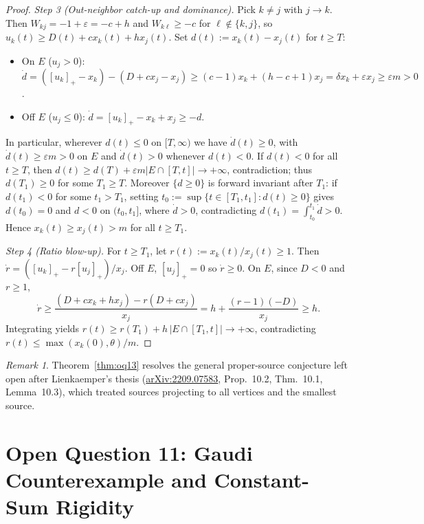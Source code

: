 \documentclass[11pt]{article}
\theoremstyle{plain}
\theoremstyle{definition}
\theoremstyle{remark}
\newtheorem{remark}{Remark}
\begin{document}
\begin{proof}
\emph{Step 3 (Out-neighbor catch-up and dominance).} Pick $k \neq j$ with $j \to k$. Then $W_{kj} = -1 + \varepsilon = -c + h$ and $W_{k\ell} \ge -c$ for $\ell \notin \{k, j\}$, so $u_k(t) \ge D(t) + c x_k(t) + h x_j(t)$. Set $d(t) := x_k(t) - x_j(t)$ for $t \ge T$:
\begin{itemize}[leftmargin=2em,itemsep=1pt]
\item On $E$ ($u_j > 0$): $\dot{d} = ([u_k]_+ - x_k) - (D + c x_j - x_j) \ge (c-1)x_k + (h - c + 1)x_j = \delta x_k + \varepsilon x_j \ge \varepsilon m > 0$.
\item Off $E$ ($u_j \le 0$): $\dot{d} = [u_k]_+ - x_k + x_j \ge -d$.
\end{itemize}
In particular, wherever $d(t) \le 0$ on $[T, \infty)$ we have $\dot{d}(t) \ge 0$, with $\dot{d}(t) \ge \varepsilon m > 0$ on $E$ and $\dot{d}(t) > 0$ whenever $d(t) < 0$. If $d(t) < 0$ for all $t \ge T$, then $d(t) \ge d(T) + \varepsilon m |E \cap [T, t]| \to +\infty$, contradiction; thus $d(T_1) \ge 0$ for some $T_1 \ge T$. Moreover $\{d \ge 0\}$ is forward invariant after $T_1$: if $d(t_1) < 0$ for some $t_1 > T_1$, setting $t_0 := \sup\{t \in [T_1, t_1] : d(t) \ge 0\}$ gives $d(t_0) = 0$ and $d < 0$ on $(t_0, t_1]$, where $\dot{d} > 0$, contradicting $d(t_1) = \int_{t_0}^{t_1} \dot{d} > 0$. Hence $x_k(t) \ge x_j(t) > m$ for all $t \ge T_1$.

\emph{Step 4 (Ratio blow-up).} For $t \ge T_1$, let $r(t) := x_k(t) / x_j(t) \ge 1$. Then $\dot{r} = ([u_k]_+ - r[u_j]_+)/x_j$. Off $E$, $[u_j]_+ = 0$ so $\dot{r} \ge 0$. On $E$, since $D < 0$ and $r \ge 1$,
\[
\dot{r} \ge \frac{(D + c x_k + h x_j) - r(D + c x_j)}{x_j} = h + \frac{(r - 1)(-D)}{x_j} \ge h.
\]
Integrating yields $r(t) \ge r(T_1) + h\,|E \cap [T_1, t]| \to +\infty$, contradicting $r(t) \le \max(x_k(0), \theta)/m$.
\end{proof}

\begin{remark}
Theorem~\ref{thm:oq13} resolves the general proper-source conjecture left open after Lienkaemper's thesis (\href{https://arxiv.org/abs/2209.07583}{arXiv:2209.07583}, Prop.~10.2, Thm.~10.1, Lemma~10.3), which treated sources projecting to all vertices and the smallest source.
\end{remark}

\section{Open Question 11: Gaudi Counterexample and Constant-Sum Rigidity}
\end{document}
